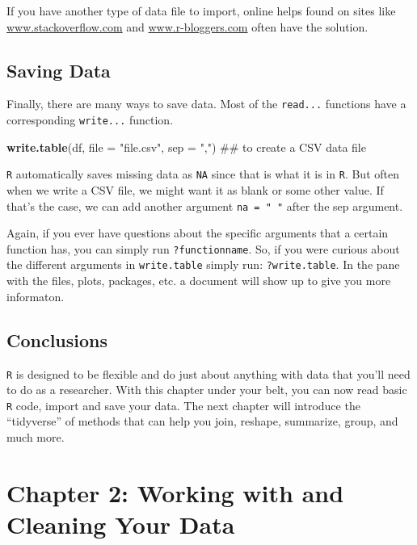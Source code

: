 \documentclass[]{tufte-book}
\newenvironment{Shaded}{}{}
\newcommand{\KeywordTok}[1]{\textcolor[rgb]{0.00,0.44,0.13}{\textbf{#1}}}
\newcommand{\DataTypeTok}[1]{\textcolor[rgb]{0.56,0.13,0.00}{#1}}
\newcommand{\StringTok}[1]{\textcolor[rgb]{0.25,0.44,0.63}{#1}}
\newcommand{\NormalTok}[1]{#1}
\theoremstyle{definition}
\theoremstyle{definition}
\theoremstyle{remark}
\begin{document}
If you have another type of data file to import, online helps found on
sites like \url{www.stackoverflow.com} and \url{www.r-bloggers.com}
often have the solution.

\section*{Saving Data}\label{saving-data}

Finally, there are many ways to save data. Most of the \texttt{read...}
functions have a corresponding \texttt{write...} function.

\begin{Shaded}
\begin{Highlighting}[]
\KeywordTok{write.table}\NormalTok{(df, }\DataTypeTok{file =} \StringTok{"file.csv"}\NormalTok{, }\DataTypeTok{sep =} \StringTok{","}\NormalTok{)  ## to create a CSV data file}
\end{Highlighting}
\end{Shaded}

\texttt{R} automatically saves missing data as \texttt{NA} since that is
what it is in \texttt{R}. But often when we write a CSV file, we might
want it as blank or some other value. If that's the case, we can add
another argument \texttt{na\ =\ "\ "} after the sep argument.

Again, if you ever have questions about the specific arguments that a
certain function has, you can simply run \texttt{?functionname}. So, if
you were curious about the different arguments in \texttt{write.table}
simply run: \texttt{?write.table}. In the pane with the files, plots,
packages, etc. a document will show up to give you more informaton.

\section*{Conclusions}\label{conclusions}

\texttt{R} is designed to be flexible and do just about anything with
data that you'll need to do as a researcher. With this chapter under
your belt, you can now read basic \texttt{R} code, import and save your
data. The next chapter will introduce the ``tidyverse'' of methods that
can help you join, reshape, summarize, group, and much more.

\chapter*{Chapter 2: Working with and Cleaning Your
Data}\label{chapter-2-working-with-and-cleaning-your-data}
\end{document}
